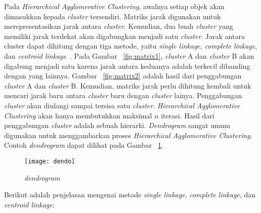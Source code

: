 Pada \textit{Hierarchical Agglomerative Clustering}, awalnya setiap objek akan dimasukkan kepada \textit{cluster} tersendiri. Matriks jarak digunakan untuk merepresentasikan jarak antara \textit{cluster}. Kemudian, dua buah \textit{cluster} yang memiliki jarak terdekat akan digabungkan menjadi satu \textit{cluster}. Jarak antara cluster dapat dihitung dengan tiga metode, yaitu \textit{single linkage}, \textit{complete linkage}, dan \textit{centroid linkage}~\cite{anil:03:afcd}. Pada Gambar ~\ref{fig:matrix1}, \textit{cluster} A dan  \textit{cluster} B akan digabung menjadi satu karena jarak antara keduanya adalah terkecil dibanding dengan yang lainnya. Gambar ~\ref{fig:matrix2} adalah hasil dari penggabungan \textit{cluster} A dan \textit{cluster} B. Kemudian, matriks jarak perlu dihitung kembali untuk mencari jarak baru antara \textit{cluster} baru dengan \textit{cluster} lainya. Penggabungan \textit{cluster} akan diulangi sampai tersisa satu \textit{cluster}. \textit{Hierarchical Agglomerative Clustering} akan hanya membutuhkan maksimal $n$ iterasi. Hasil dari penggabungan \textit{cluster} adalah sebuah hierarki. \textit{Dendrogram} sangat umum digunakan untuk menggambarkan proses \textit{Hierarchical Agglomerative Clustering}. Contoh \textit{dendrogram} dapat dilihat pada Gambar ~\ref{fig:dendo}.\\


\begin{figure}[H]
    \centering  
    \texttt{[image: dendo]}  
    \caption[\textit{dendrogram} ]{\textit{dendrogram}} 
    \label{fig:dendo} 
\end{figure}


Berikut adalah penjelasan mengenai metode \textit{single linkage}, \textit{complete linkage}, dan \textit{centroid linkage}:

